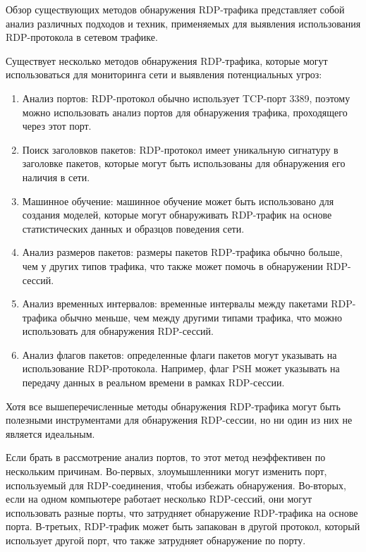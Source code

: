 \documentclass[bachelor, och, coursework]{SCWorks}
\begin{document}

Обзор существующих методов обнаружения RDP-трафика представляет собой анализ различных подходов и техник, применяемых для выявления 
использования RDP-протокола в сетевом трафике.

Существует несколько методов обнаружения RDP-трафика, которые могут использоваться для мониторинга сети и выявления потенциальных угроз:

\begin{enumerate}
  \item Анализ портов: RDP-протокол обычно использует TCP-порт 3389, поэтому можно использовать анализ портов для обнаружения трафика, 
  проходящего через этот порт.
  \item Поиск заголовков пакетов: RDP-протокол имеет уникальную сигнатуру в заголовке пакетов, которые могут быть использованы для 
  обнаружения его наличия в сети.
  \item Машинное обучение: машинное обучение может быть использовано для создания моделей, которые могут обнаруживать RDP-трафик на 
  основе статистических данных и образцов поведения сети.
  \item Анализ размеров пакетов: размеры пакетов RDP-трафика обычно больше, чем у других типов трафика, что также может помочь в 
  обнаружении RDP-сессий.
  \item Анализ временных интервалов: временные интервалы между пакетами RDP-трафика обычно меньше, чем между другими типами трафика, 
  что можно использовать для обнаружения RDP-сессий.
  \item Анализ флагов пакетов: определенные флаги пакетов могут указывать на использование RDP-протокола. Например, флаг PSH может 
  указывать на передачу данных в реальном времени в рамках RDP-сессии.
\end{enumerate}

Хотя все вышеперечисленные методы обнаружения RDP-трафика могут быть полезными инструментами для обнаружения RDP-сессии, но ни один из них 
не является идеальным.

Если брать в рассмотрение анализ портов, то этот метод неэффективен по нескольким причинам. Во-первых, злоумышленники могут изменить порт, 
используемый для RDP-соединения, чтобы избежать обнаружения. Во-вторых, если на одном компьютере работает несколько RDP-сессий, они могут 
использовать разные порты, что затрудняет обнаружение RDP-трафика на основе порта. В-третьих, RDP-трафик может быть запакован в другой 
протокол, который использует другой порт, что также затрудняет обнаружение по порту.
\end{document}
